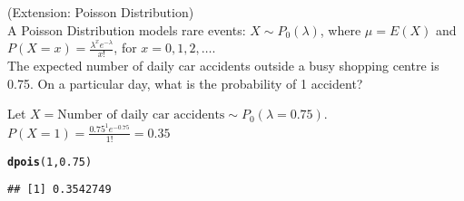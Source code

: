 \documentclass[bigtut]{tutorial}\usepackage[]{graphicx}\usepackage[]{color}
\makeatletter
\newcommand{\hlnum}[1]{\textcolor[rgb]{0.686,0.059,0.569}{#1}}%
\newcommand{\hlstd}[1]{\textcolor[rgb]{0.345,0.345,0.345}{#1}}%
\newcommand{\hlkwd}[1]{\textcolor[rgb]{0.737,0.353,0.396}{\textbf{#1}}}%
\newenvironment{kframe}{%
 \def\at@end@of@kframe{}%
 \ifinner\ifhmode%
  \def\at@end@of@kframe{\end{minipage}}%
  \begin{minipage}{\columnwidth}%
 \fi\fi%
 \def\FrameCommand##1{\hskip\@totalleftmargin \hskip-\fboxsep
 \colorbox{shadecolor}{##1}\hskip-\fboxsep
     \hskip-\linewidth \hskip-\@totalleftmargin \hskip\columnwidth}%
 \MakeFramed {\advance\hsize-\width
   \@totalleftmargin\z@ \linewidth\hsize
   \@setminipage}}%
 {\par\unskip\endMakeFramed%
 \at@end@of@kframe}
\newenvironment{knitrout}{}{} %
\makeatother
\begin{document}
\begin{tutorial}
\begin{questions}
\question (Extension: Poisson Distribution) \\

A Poisson Distribution models rare events:
$X \sim P_{0}(\lambda)$, where $\mu = E(X)$ and $P(X=x) = \frac{\lambda^x e^{-\lambda}}{x!}$, for $x = 0,1,2, \ldots$. \\

The expected number of daily car accidents outside a busy shopping centre is 0.75. On a particular day, what is the probability of 1 accident?

\begin{solution}

Let $X = \mbox{Number of daily car accidents} \sim P_{0}(\lambda = 0.75)$. \\
$P(X=1) = \frac{0.75^1 e^{-0.75}}{1!} = 0.35$

\begin{knitrout}
\color{fgcolor}\begin{kframe}
\begin{alltt}
\hlkwd{dpois}\hlstd{(}\hlnum{1}\hlstd{,}\hlnum{0.75}\hlstd{)}
\end{alltt}
\begin{verbatim}
## [1] 0.3542749
\end{verbatim}
\end{kframe}
\end{knitrout}
\end{solution}



\end{questions}
\end{tutorial}
\end{document}
